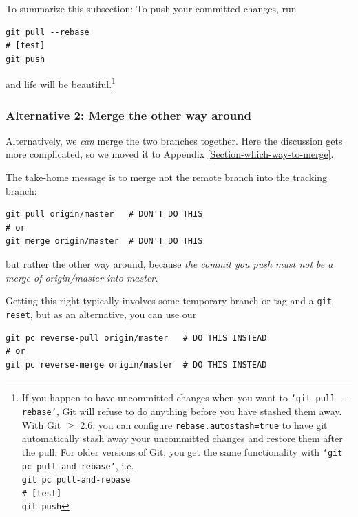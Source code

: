 \documentclass[12pt,pdftex]{article}
\begin{document}
\bigskip

To summarize this subsection:
To push your committed changes, run
\lstset{frame=single,basicstyle=\ttfamily\footnotesize,language=sh,label= ,caption= ,captionpos=b,numbers=none}
\begin{lstlisting}
git pull --rebase
# [test]
git push
\end{lstlisting}
and life will be beautiful.\footnote{If you happen to have uncommitted changes when you want to
\texttt{‘git pull -{}-rebase’}, Git will refuse to do anything before you have
stashed them away.
With Git \(\ge\) 2.6, you can configure \verb~rebase.autostash=true~ to have git
automatically stash away your uncommitted changes and restore them after
the pull.
For older versions of Git, you get the same functionality with
\texttt{‘git pc pull-and-rebase’}, i.e.\\
\noindent\qquad\qquad  \texttt{git pc pull-and-rebase}\\
\noindent\qquad\qquad  \texttt{\# [test]}\\
\noindent\qquad\qquad  \texttt{git push}}


\subsubsection{Alternative 2: Merge the other way around}
\label{sec-5-1-2}

Alternatively, we \emph{can} merge the two branches together.
Here the discussion gets more complicated, so we moved it
to Appendix \ref{Section-which-way-to-merge}.

The take-home message is to merge not the remote branch into the
tracking branch:
\lstset{frame=single,basicstyle=\ttfamily\footnotesize,language=sh,label= ,caption= ,captionpos=b,numbers=none}
\begin{lstlisting}
git pull origin/master   # DON'T DO THIS
# or
git merge origin/master  # DON'T DO THIS
\end{lstlisting}
but rather the other way around, because
\emph{%
the commit you push must not be a merge of \emph{origin/master} into
\emph{master}.
}

Getting this right typically involves some temporary branch or tag and
a \texttt{git reset}, but as an alternative, you can use our
\lstset{frame=single,basicstyle=\ttfamily\footnotesize,language=sh,label= ,caption= ,captionpos=b,numbers=none}
\begin{lstlisting}
git pc reverse-pull origin/master   # DO THIS INSTEAD
# or
git pc reverse-merge origin/master  # DO THIS INSTEAD
\end{lstlisting}
\end{document}
